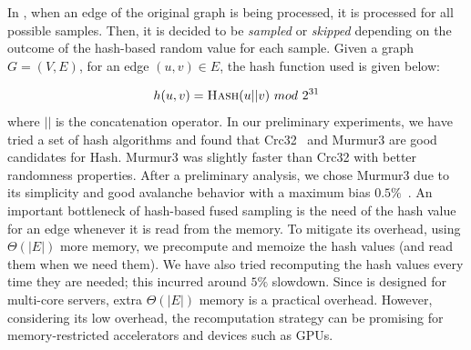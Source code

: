 \documentclass[review]{elsarticle}
\newcommand\acro{{\sc{HyperFuseR\xspace}\xspace}\xspace}
\begin{document}
In \acro, when an edge of the original graph is being processed, it is processed for all possible samples. Then, it is decided to be {\it sampled} or {\it skipped} depending on the outcome of the hash-based random value for each sample. Given a graph $G = (V, E)$, for an edge $(u, v) \in E$, the hash function used is given below:

\begin{equation}
    \label{eq:hash}
    h(u,v) = \mbox{{\sc Hash}}(u||v)~mod~2^{31}  
\end{equation} %
where $||$ is the concatenation operator. In our preliminary experiments, we have tried a set of hash algorithms and found that {\sc Crc32}~\cite{koopman200232} and {{\sc Murmur3}} are good candidates for {\sc Hash}. {{\sc Murmur3}} was slightly faster than {\sc Crc32} with better randomness properties. After a preliminary analysis, we chose {{\sc Murmur3}} due to its simplicity and good avalanche behavior with a maximum bias $0.5\%$~\cite{MurmurHash3Performance}. An  important bottleneck of hash-based fused sampling is the need of the hash value for an edge whenever it is read from the memory. To mitigate its overhead, using $\Theta(|E|)$ more memory, we precompute and memoize the hash values (and read them when we need them). We have also tried recomputing the hash values every time they are needed; this incurred around $5\%$ slowdown. Since {\acro} is designed for multi-core servers, extra $\Theta(|E|)$ memory is a practical overhead. However, considering its low overhead, the recomputation strategy can be promising for memory-restricted accelerators and devices such as GPUs.
\end{document}
